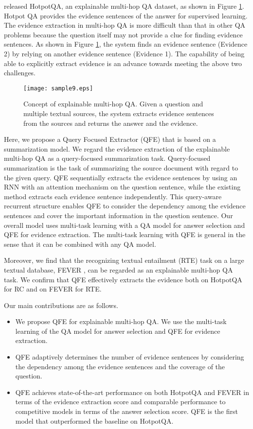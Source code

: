 \documentclass[11pt,a4paper]{article}
\theoremstyle{definition}
\begin{document}
	\citet{hotpot} released HotpotQA, an explainable multi-hop QA dataset, as shown in Figure \ref{sample}.
	Hotpot QA provides the evidence sentences of the answer for supervised learning.
	The evidence extraction in multi-hop QA is more difficult than that in other QA problems because the question itself may not provide a clue for finding evidence sentences.
As shown in Figure \ref{sample}, the system finds an evidence sentence (Evidence 2) by relying on another evidence sentence (Evidence 1).
	The capability of being able to explicitly extract evidence is an advance towards meeting the above two challenges.


	
	\begin{figure}[t!]
		\begin{center}
			\texttt{[image: sample9.eps]} \caption{Concept of explainable multi-hop QA.
			Given a question and multiple textual sources, the system extracts evidence sentences from the sources and returns the answer and the evidence.}
			\label{sample} \end{center}	
	\end{figure}
	
    Here, we propose a Query Focused Extractor (QFE) that is based on a summarization model.
    We regard the evidence extraction of the explainable multi-hop QA as a query-focused summarization task. Query-focused summarization is the task of summarizing the source document with regard to the given query.
	QFE sequentially extracts the evidence sentences by using an RNN with an attention mechanism on the question sentence, while the existing method extracts each evidence sentence independently.
	This query-aware recurrent structure enables QFE to consider the dependency among the evidence sentences and cover the important information in the question sentence.
    Our overall model uses multi-task learning with a QA model for answer selection and QFE for evidence extraction. The multi-task learning with QFE is general in the sense that it can be combined with any QA model.

    Moreover, we find that the recognizing textual entailment (RTE) task on a large textual database, FEVER \cite{fever}, can be regarded as an explainable multi-hop QA task. We confirm that QFE effectively extracts the evidence both on HotpotQA for RC and on FEVER for RTE.
    
	Our main contributions are as follows.
	\begin{itemize}
		\item We propose QFE for explainable multi-hop QA.
		We use the multi-task learning of the QA model for answer selection and QFE for evidence extraction.
		\item QFE adaptively determines the number of evidence  sentences by considering the dependency among the evidence sentences and the coverage of the question.
		\item QFE achieves state-of-the-art performance on both HotpotQA and FEVER in terms of the evidence extraction score and comparable performance to competitive models in terms of the answer selection score.
		QFE is the first model that outperformed the baseline on HotpotQA.
	\end{itemize}
	
\end{document}
